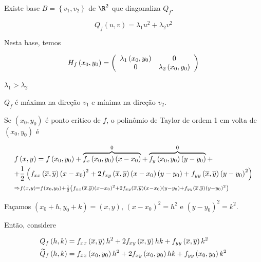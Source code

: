 \documentclass{book}
\begin{document}
Existe base $B = \left\{ {v_1 ,v_2 } \right\}$ de $\R^2$ que diagonaliza $Q_f$.

\[
Q_f \left( {u,v} \right) = \lambda _1 u^2  + \lambda _2 v^2
\]

Nesta base, temos

\[
H_f \left( {x_0 ,y_0 } \right) = \left( {\begin{array}{*{20}c}
{\lambda _1 \left( {x_0 ,y_0 } \right)} & 0  \\
0 & {\lambda _2 \left( {x_0 ,y_0 } \right)}  \\

\end{array} } \right)
\]

$\lambda_1 > \lambda_2$

$Q_f$ \'e m\'axima na dire\c c\~ao $v_1$ e m\'inima na dire\c c\~ao $v_2$.


Se $\left( {x_0 ,y_0 } \right)$ \'e ponto cr\'itico de $f$, o polin\^omio de Taylor de ordem 1 em volta de $\left( {x_0 ,y_0 } \right)$ \'e

\[
\begin{gathered}
  f\left( {x,y} \right) = f\left( {x_0 ,y_0 } \right) + \overbrace {f_x \left( {x_0 ,y_0 } \right)\left( {x - x_0 } \right)}^0 + \overbrace {f_y \left( {x_0 ,y_0 } \right)\left( {y - y_0 } \right)}^0 +  \hfill \\
+ \frac{1}
{2}\left( {f_{xx} \left( {\overline x ,\overline y } \right)\left( {x - x_0 } \right)^2  + 2f_{xy} \left( {\overline x ,\overline y } \right)\left( {x - x_0 } \right)\left( {y - y_0 } \right) + f_{yy} \left( {\overline x ,\overline y } \right)\left( {y - y_0 } \right)^2 } \right) \hfill \\ 
\scriptstyle{ \Rightarrow f\left( {x,y} \right) = f\left( {x_0 ,y_0 } \right) + \frac{1}
{2}\left( {f_{xx} \left( {\overline x ,\overline y } \right)\left( {x - x_0 } \right)^2  + 2f_{xy} \left( {\overline x ,\overline y } \right)\left( {x - x_0 } \right)\left( {y - y_0 } \right) + f_{yy} \left( {\overline x ,\overline y } \right)\left( {y - y_0 } \right)^2 } \right)} \hfill \\
\end{gathered}
\]

Fa\c camos $\left( {x_0  + h,y_0  + k} \right) = \left( {x,y} \right)$, $\left( {x - x_0 } \right)^2  = h^2$ e $\left( {y - y_0 } \right)^2  = k^2$.

Ent\~ao, considere

\[
\begin{gathered}
  Q_f \left( {h,k} \right) = f_{xx} \left( {\overline x ,\overline y } \right)h^2  + 2f_{xy} \left( {\overline x ,\overline y } \right)hk + f_{yy} \left( {\overline x ,\overline y } \right)k^2  \hfill \\
  \widetilde Q_f \left( {h,k} \right) = f_{xx} \left( {x_0 ,y_0 } \right)h^2  + 2f_{xy} \left( {x_0 ,y_0 } \right)hk + f_{yy} \left( {x_0 ,y_0 } \right)k^2  \hfill \\
\end{gathered}
\]
\end{document}
